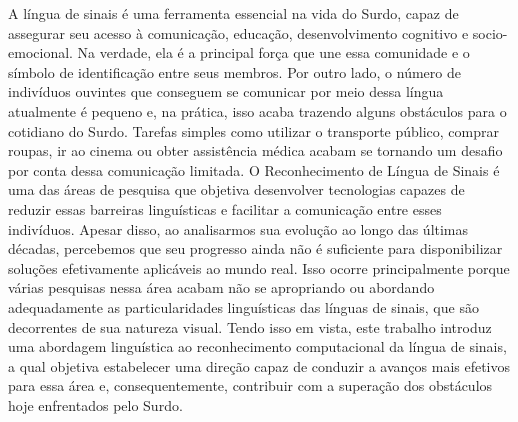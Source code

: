 \begin{resumo}[Resumo]
  \noindent
  A língua de sinais é uma ferramenta essencial na vida do Surdo, capaz de assegurar seu acesso à comunicação, educação, desenvolvimento cognitivo e socio-emocional.
  Na verdade, ela é a principal força que une essa comunidade e o símbolo de identificação entre seus membros.
  Por outro lado, o número de indivíduos ouvintes que conseguem se comunicar por meio dessa língua atualmente é pequeno e, na prática, isso acaba trazendo alguns obstáculos para o cotidiano do Surdo.
  Tarefas simples como utilizar o transporte público, comprar roupas, ir ao cinema ou obter assistência médica acabam se tornando um desafio por conta dessa comunicação limitada.
  O Reconhecimento de Língua de Sinais é uma das áreas de pesquisa que objetiva desenvolver tecnologias capazes de reduzir essas barreiras linguísticas e facilitar a comunicação entre esses indivíduos.
  Apesar disso, ao analisarmos sua evolução ao longo das últimas décadas, percebemos que seu progresso ainda não é suficiente para disponibilizar soluções efetivamente aplicáveis ao mundo real.
  Isso ocorre principalmente porque várias pesquisas nessa área acabam não se apropriando ou abordando adequadamente as particularidades linguísticas das línguas de sinais, que são decorrentes de sua natureza visual.
  Tendo isso em vista, este trabalho introduz uma abordagem linguística ao reconhecimento computacional da língua de sinais, a qual objetiva estabelecer uma direção capaz de conduzir a avanços mais efetivos para essa área e, consequentemente, contribuir com a superação dos obstáculos hoje enfrentados pelo Surdo.






\end{resumo}
